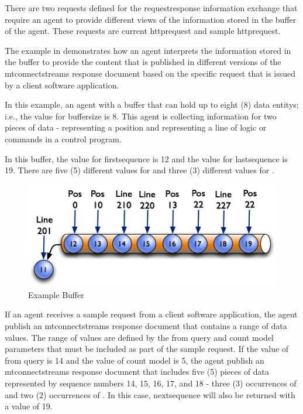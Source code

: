 \documentclass{mtconnect}	%
\begin{document}
There are two \glspl{request} defined for the \gls{requestresponse} information exchange that require an \gls{agent} to provide different views of the information stored in the \gls{buffer} of the \gls{agent}.  These \glspl{request} are \gls{current httprequest} and \gls{sample httprequest}.

The example in  demonstrates how an \gls{agent} interprets the information stored in the \gls{buffer} to provide the content that is published in different versions of the \gls{mtconnectstreams response document} based on the specific \gls{request} that is issued by a client software application.

In this example, an \gls{agent} with a \gls{buffer} that can hold up to eight (8) \glspl{data entity}; i.e., the value for \gls{buffersize} is 8.  This \gls{agent} is collecting information for two pieces of data -  representing a position and  representing a line of logic or commands in a control program.  

In this \gls{buffer}, the value for \gls{firstsequence} is 12 and the value for \gls{lastsequence} is 19.  There are five (5) different values for  and three (3) different values for .  

\begin{figure}[ht]
  \centering
  \includegraphics[width=1.0\textwidth]{figures/example-buffer.png}
  \caption{Example Buffer}
  \label{fig:example-buffer}
\end{figure}

\FloatBarrier

If an \gls{agent} receives a \gls{sample request} from a client software application, the \gls{agent} \MUST publish an \gls{mtconnectstreams response document} that contains a range of data values.  The range of values are defined by the \gls{from query} and \gls{count model} parameters that must be included as part of the \gls{sample request}.  If the value of \gls{from query} is 14 and the value of \gls{count model} is 5, the \gls{agent} \MUST publish an \gls{mtconnectstreams response document} that includes five (5) pieces of data represented by \glspl{sequence number} 14, 15, 16, 17, and 18 - three (3) occurrences of  and two (2) occurrences of .  In this case, \gls{nextsequence} will also be returned with a value of 19.
\end{document}
